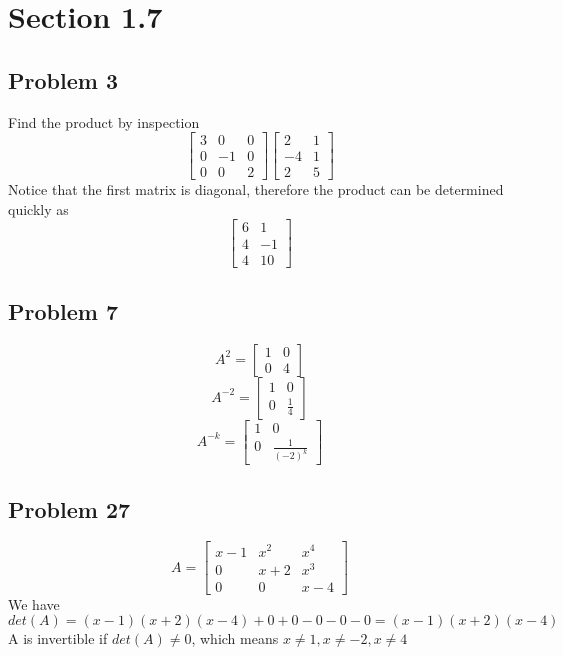 \documentclass[a4paper,12pt]{report}
\begin{document}
\section*{Section 1.7}
\subsection*{Problem 3}
Find the product by inspection
\[
\begin{bmatrix}
    3       & 0 & 0  \\
    0       & -1 & 0\\
    0      & 0 & 2 
\end{bmatrix}
\begin{bmatrix}
    2       & 1 \\
    -4       & 1 \\
    2       & 5
\end{bmatrix}
\]
Notice that the first matrix is diagonal, therefore the product can be determined quickly as
\[
\begin{bmatrix}
    6       & 1 \\
    4      & -1 \\
    4       & 10 
\end{bmatrix}
\]

\subsection*{Problem 7}
\[
A^2=
\begin{bmatrix}
    1       & 0 \\
    0      & 4
\end{bmatrix}
\]
\[
A^{-2}=
\begin{bmatrix}
    1       & 0 \\
    0      & \frac{1}{4}
\end{bmatrix}
\]
\[
A^{-k}=
\begin{bmatrix}
    1       & 0 \\
    0      & \frac{1}{(-2)^k}
\end{bmatrix}
\]

\subsection*{Problem 27}
\[
A=
\begin{bmatrix}
    x-1  & x^2     & x^4 \\
    0      & x+2 & x^3 \\
    0 & 0 & x-4
\end{bmatrix}
\]
We have
\[det(A)=(x-1)(x+2)(x-4) + 0+ 0 - 0 -0 -0 = (x-1)(x+2)(x-4)\]
A is invertible if \(det(A)\neq0\), which means \(x\neq1,x\neq-2,x\neq4\)
\end{document}
